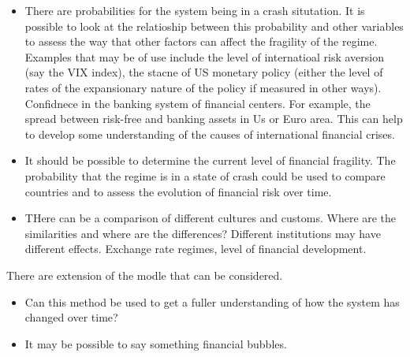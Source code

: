 \documentclass[12pt, a4paper, oneside]{article} %
\begin{document}
\begin{itemize}
\item There are probabilities for the system being in a crash situtation.  It is possible to look at the relatioship between this probability and other variables to assess the way that other factors can affect the fragility of the regime.  Examples that may be of use include the level of internatioal risk aversion (say the VIX index), the stacne of US monetary policy (either the level of rates of the expansionary nature of the policy if measured in other ways).  Confidnece in the banking system of financial centers.  For example, the spread between risk-free and banking assets in Us or Euro area. This can help to develop some understanding of the causes of international financial crises. 
\item It should be possible to determine the current level of financial fragility.  The probability that the regime is in a state of crash could be used to compare countries and to assess the evolution of financial risk over time.  
\item THere can be a comparison of different cultures and customs. Where are the similarities and where are the differences?  Different institutions may have different effects. Exchange rate regimes, level of financial development. 
\end{itemize}

There are extension of the modle that can be considered. 
\begin{itemize}
\item Can this method be used to get a fuller understanding of how the system has changed over time?  
\item It may be possible to say something financial bubbles. 
\end{itemize}



\end{document}
